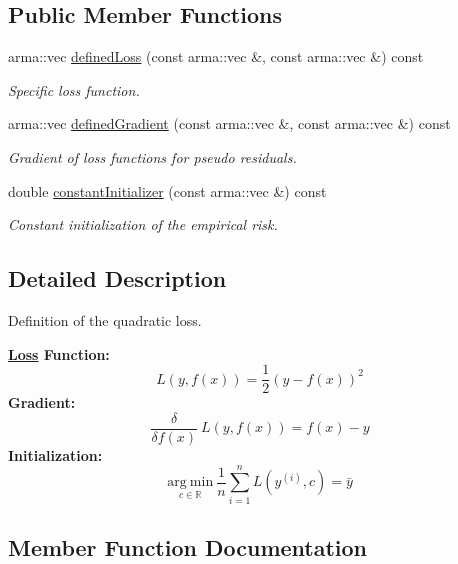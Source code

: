 \subsection*{Public Member Functions}
\begin{DoxyCompactItemize}
\item 
arma\+::vec \mbox{\hyperlink{classloss_1_1_quadratic_loss_ae34f68243ffe021e309ed73a68796e1e}{defined\+Loss}} (const arma\+::vec \&, const arma\+::vec \&) const
\begin{DoxyCompactList}\small\item\em Specific loss function. \end{DoxyCompactList}\item 
arma\+::vec \mbox{\hyperlink{classloss_1_1_quadratic_loss_adb4da1acbad702b5ba8570abaa17d373}{defined\+Gradient}} (const arma\+::vec \&, const arma\+::vec \&) const
\begin{DoxyCompactList}\small\item\em Gradient of loss functions for pseudo residuals. \end{DoxyCompactList}\item 
double \mbox{\hyperlink{classloss_1_1_quadratic_loss_a43989f3fbecc27351513afe1136cdf38}{constant\+Initializer}} (const arma\+::vec \&) const
\begin{DoxyCompactList}\small\item\em Constant initialization of the empirical risk. \end{DoxyCompactList}\end{DoxyCompactItemize}


\subsection{Detailed Description}
Definition of the quadratic loss. 

{\bfseries \mbox{\hyperlink{classloss_1_1_loss}{Loss}} Function\+:} \[ L(y, f(x)) = \frac{1}{2}\left( y - f(x) \right)^2 \] {\bfseries Gradient\+:} \[ \frac{\delta}{\delta f(x)}\ L(y, f(x)) = f(x) - y \] {\bfseries Initialization\+:} \[ \underset{c\in\mathbb{R}}{\mathrm{arg~min}}\ \frac{1}{n}\sum\limits_{i=1}^n L\left(y^{(i)}, c\right) = \bar{y} \] 

\subsection{Member Function Documentation}
\mbox{\label{classloss_1_1_quadratic_loss_a43989f3fbecc27351513afe1136cdf38}} 
